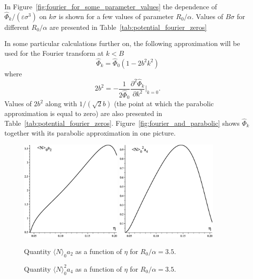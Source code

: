 In Figure~\ref{fig:fourier_for_some_parameter_values} the dependence of $\hat{\Phi}_k/(\varepsilon\sigma^3)$ on $k\sigma$ is shown for a few values of parameter $R_0/\alpha$. Values of $B\sigma$ for different $R_0/\alpha$ are presented in Table~\ref{tab:potential_fourier_zeros}

In some particular calculations further on, the following approximation will be used for the Fourier transform at $k<B$
\begin{equation}
	\label{eq:potent_parabolic}
	\hat{\Phi}_k = \hat{\Phi}_0(1 - 2b^2k^2)
\end{equation}
where 
\begin{equation}
	2b^2 = -\frac{1}{2\hat{\Phi}_0} \frac{\partial^2 \hat{\Phi}_k}{\partial k^2} \bigg|_{k=0}.
\end{equation}
Values of $2b^2$ along with $1/(\sqrt{2}b)$ (the point at which the parabolic approximation is equal to zero) are also presented in Table~\ref{tab:potential_fourier_zeros}. Figure~\ref{fig:fourier_and_parabolic} shows $\hat{\Phi}_k$ together with its parabolic approximation in one picture.

\begin{figure}[htbp]
	\includegraphics[width=0.45\textwidth,angle=0]{a2_as_function_of_eta} \hfill
	\includegraphics[width=0.45\textwidth,angle=0]{a4_as_function_of_eta} \\
	\parbox{0.5\textwidth}{\caption{\label{fig:a2_vs_eta} Quantity $\langle N \rangle_0 a_2$ as a function of $\eta$ for $R_0/\alpha=3.5$.
	}} \hfill
	\parbox{0.45\textwidth}{\caption{\label{fig:a4_vs_eta} Quantity $\langle N \rangle_0^2 a_4$ as a function of $\eta$ for $R_0/\alpha=3.5$.
	}}
\end{figure}

